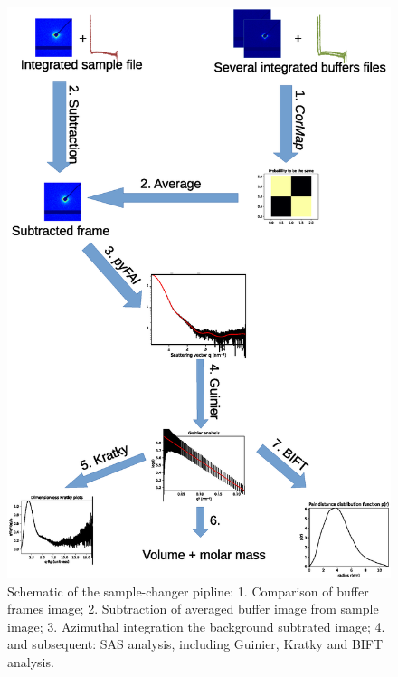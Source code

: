 \documentclass[preprint]{iucr}              %
\begin{document}
\begin{figure}
\label{samplechanger_worflow}
\includegraphics*[width=12cm]{samplechanger_pipeline.eps}
\caption{Schematic of the sample-changer pipline: 
1. Comparison of buffer frames image;
2. Subtraction of averaged buffer image from sample image;
3. Azimuthal integration the background subtrated image;
4. and subsequent: SAS analysis, including Guinier, Kratky and BIFT analysis.}
\end{figure}
\end{document}
